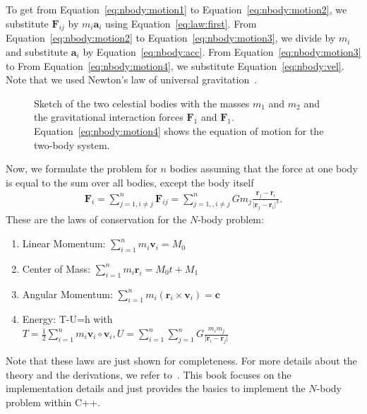 To get from Equation~\eqref{eq:nbody:motion1} to Equation~\eqref{eq:nbody:motion2}, we substitute $\mathbf{F}_{ij}$ by $m_i \mathbf{a}_i$ using Equation~\ref{eq:law:first}.  From Equation~\eqref{eq:nbody:motion2} to Equation~\eqref{eq:nbody:motion3}, we divide by $m_i$ and substitute $\mathbf{a}_i$ by Equation~\ref{eq:nbody:acc}. From Equation~\eqref{eq:nbody:motion3} to From Equation~\eqref{eq:nbody:motion4}, we substitute Equation~\ref{eq:nbody:vel}. Note that we used Newton's law of universal gravitation~\cite{newton1833philosophiae}.\\


\begin{figure}[tb]
\centering
{}
\caption{Sketch of the two celestial bodies with the masses $m_1$ and $m_2$ and the gravitational interaction forces $\mathbf{F}_1$ and $\mathbf{F}_1$. Equation~\ref{eq:nbody:motion4} shows the equation of motion for the two-body system.   }
\label{fig:nbody:motion}
\end{figure}

Now, we formulate the problem for $n$ bodies assuming that the force at one body is equal to the sum over all bodies, except the body itself
\begin{align}
\mathbf{F}_i = \sum\limits_{j=1,i\neq j}^n \mathbf{F}_{ij} = \sum\limits_{j=1,,i\neq j}^n G  m_j \frac{\mathbf{r}_j - \mathbf{r}_i}{\vert \mathbf{r}_j - \mathbf{r}_i\vert^3} \text{.} \label{eq:nbody:motion}
\end{align}
These are the laws of conservation for the $N$-body problem:
\begin{enumerate}
\item Linear Momentum: $\sum\limits_{i=1}^n m_i \mathbf{v}_i = M_0$
\item Center of Mass: $\sum\limits_{i=1}^n m_i \mathbf{r}_i = M_0 t + M_1$
\item Angular Momentum: $\sum\limits_{i=1}^n m_i (\mathbf{r}_i \times \mathbf{v}_i) = \mathbf{c}$
\item Energy: T-U=h with \\
$ T = \frac{1}{2} \sum\limits_{i=1}^n m_i \mathbf{v}_i \circ \mathbf{v}_i  , U= \sum\limits_{i=1}^n \sum\limits_{j=1}^n G \frac{m_i m_j}{\vert\mathbf{r}_i - \mathbf{r}_j\vert} $
\end{enumerate}
Note that these laws are just shown for completeness. For more details about the theory and the derivations, we refer to~\cite{aarseth2008cambridge,aarseth2003gravitational}. This book focuses on the implementation details and just provides the basics to implement the $N$-body problem within C++.

